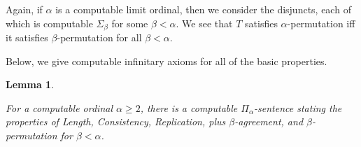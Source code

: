 \documentclass{article}
\newtheorem{lem}[thm]{Lemma}
\begin{document}
\bigskip
\noindent
Again, if $\alpha$ is a computable limit ordinal, then we consider the disjuncts, each of which is computable $\Sigma_\beta$ for some $\beta < \alpha$.  We see that $T$ satisfies $\alpha$-permutation iff it satisfies $\beta$-permutation for all $\beta < \alpha$. 

\bigskip

Below, we give computable infinitary axioms for all of the basic properties.

\begin{lem}\label{lem:property'sAxioms}

For a computable ordinal $\alpha\geq 2$, there is a computable $\Pi_\alpha$-sentence stating the properties of Length, Consistency, Replication, plus $\beta$-agreement, and $\beta$-permutation for $\beta < \alpha$.  

\end{lem}
\end{document}
